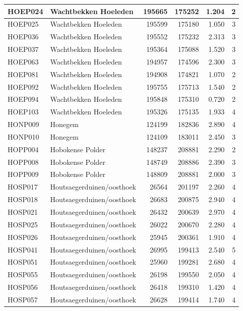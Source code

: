 \documentclass[11pt,]{book}
\begin{document}
\begin{table}
\begin{tabular}[t]{l|l|r|r|r|r}
\hline
HOEP024 & Wachtbekken Hoeleden & 195665 & 175252 & 1.204 & 2\\
\hline
HOEP025 & Wachtbekken Hoeleden & 195599 & 175180 & 1.050 & 3\\
\hline
HOEP036 & Wachtbekken Hoeleden & 195552 & 175232 & 2.313 & 3\\
\hline
HOEP037 & Wachtbekken Hoeleden & 195364 & 175088 & 1.520 & 3\\
\hline
HOEP063 & Wachtbekken Hoeleden & 194957 & 174596 & 2.300 & 3\\
\hline
HOEP081 & Wachtbekken Hoeleden & 194908 & 174821 & 1.070 & 2\\
\hline
HOEP092 & Wachtbekken Hoeleden & 195755 & 175713 & 1.540 & 2\\
\hline
HOEP094 & Wachtbekken Hoeleden & 195848 & 175310 & 0.720 & 2\\
\hline
HOEP103 & Wachtbekken Hoeleden & 195326 & 175135 & 1.933 & 4\\
\hline
HONP009 & Honegem & 124199 & 182836 & 2.890 & 4\\
\hline
HONP010 & Honegem & 124109 & 183011 & 2.450 & 3\\
\hline
HOPP004 & Hobokense Polder & 148237 & 208881 & 2.290 & 2\\
\hline
HOPP008 & Hobokense Polder & 148749 & 208886 & 2.390 & 3\\
\hline
HOPP009 & Hobokense Polder & 148809 & 208881 & 2.000 & 3\\
\hline
HOSP017 & Houtsaegerduinen/oosthoek & 26564 & 201197 & 2.260 & 4\\
\hline
HOSP018 & Houtsaegerduinen/oosthoek & 26683 & 200875 & 2.940 & 4\\
\hline
HOSP021 & Houtsaegerduinen/oosthoek & 26432 & 200639 & 2.970 & 4\\
\hline
HOSP025 & Houtsaegerduinen/oosthoek & 26022 & 200670 & 2.280 & 4\\
\hline
HOSP026 & Houtsaegerduinen/oosthoek & 25945 & 200361 & 1.910 & 4\\
\hline
HOSP041 & Houtsaegerduinen/oosthoek & 26995 & 199413 & 2.540 & 5\\
\hline
HOSP051 & Houtsaegerduinen/oosthoek & 25960 & 199281 & 2.680 & 4\\
\hline
HOSP055 & Houtsaegerduinen/oosthoek & 26198 & 199550 & 2.050 & 4\\
\hline
HOSP056 & Houtsaegerduinen/oosthoek & 26418 & 199310 & 1.420 & 4\\
\hline
HOSP057 & Houtsaegerduinen/oosthoek & 26628 & 199414 & 1.740 & 4\\

\end{tabular}
\end{table}
\end{document}
